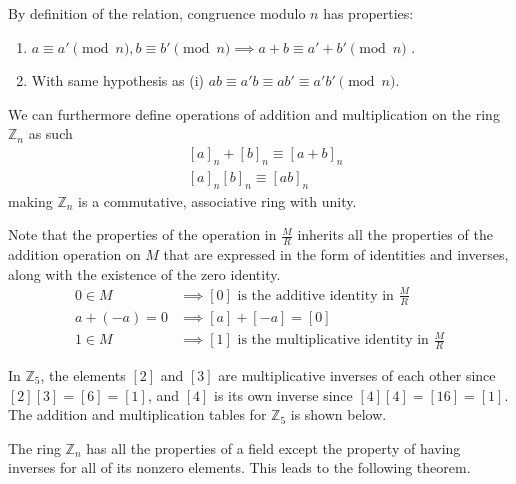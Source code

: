   By definition of the relation, congruence modulo $n$ has properties: 
  \begin{enumerate}
    \item $a \equiv a' \pmod{n}, b \equiv b' \pmod{n} \implies a + b \equiv a' + b' \pmod{n}$ . 
    \item With same hypothesis as (i) $a b \equiv a' b \equiv a b' \equiv a' b' \pmod{n}$. 
  \end{enumerate}
  We can furthermore define operations of addition and multiplication on the ring $\mathbb{Z}_{n}$ as such 
  \begin{align*}
    & [a]_{n} + [b]_{n} \equiv [a + b]_{n} \\
    & [a]_{n} [b]_{n} \equiv [ab]_{n}
  \end{align*}
  making $\mathbb{Z}_{n}$ is a commutative, associative ring with unity. 

  Note that the properties of the operation in $\frac{M}{R}$ inherits all the properties of the addition operation on $M$ that are expressed in the form of identities and inverses, along with the existence of the zero identity. 
  \begin{align*}
    0 \in M & \implies [0] \text{ is the additive identity in } \frac{M}{R} \\
    a + (-a) = 0 & \implies [a] + [-a] = [0] \\
    1 \in M & \implies [1] \text{ is the multiplicative identity in } \frac{M}{R}
  \end{align*}

  \begin{example}
    In $\mathbb{Z}_{5}$, the elements $[2]$ and $[3]$ are multiplicative inverses of each other since $[2] [3] = [6] = [1]$, and $[4]$ is its own inverse since $[4] [4] = [16] = [1]$. The addition and multiplication tables for $\mathbb{Z}_5$ is shown below. 
  \end{example}

  The ring $\mathbb{Z}_n$ has all the properties of a field except the property of having inverses for all of its nonzero elements. This leads to the following theorem. 

